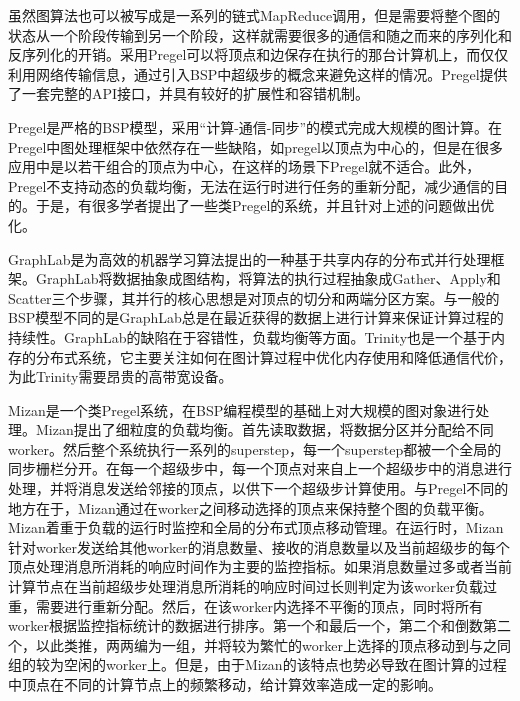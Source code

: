 虽然图算法也可以被写成是一系列的链式MapReduce调用，但是需要将整个图的状态从一个阶段传输到另一个阶段，这样就需要很多的通信和随之而来的序列化和反序列化的开销。采用Pregel可以将顶点和边保存在执行的那台计算机上，而仅仅利用网络传输信息，通过引入BSP中超级步的概念来避免这样的情况。Pregel提供了一套完整的API接口，并具有较好的扩展性和容错机制。

Pregel是严格的BSP模型，采用“计算-通信-同步”的模式完成大规模的图计算。在Pregel中图处理框架中依然存在一些缺陷，如pregel以顶点为中心的，但是在很多应用中是以若干组合的顶点为中心，在这样的场景下Pregel就不适合。此外，Pregel不支持动态的负载均衡，无法在运行时进行任务的重新分配，减少通信的目的。于是，有很多学者提出了一些类Pregel的系统，并且针对上述的问题做出优化。

GraphLab\cite{low2010graphlab}是为高效的机器学习算法提出的一种基于共享内存的分布式并行处理框架。GraphLab将数据抽象成图结构，将算法的执行过程抽象成Gather、Apply和Scatter三个步骤，其并行的核心思想是对顶点的切分和两端分区方案。与一般的BSP模型不同的是GraphLab总是在最近获得的数据上进行计算来保证计算过程的持续性。GraphLab的缺陷在于容错性，负载均衡等方面。Trinity\cite{shao2013trinity}也是一个基于内存的分布式系统，它主要关注如何在图计算过程中优化内存使用和降低通信代价，为此Trinity需要昂贵的高带宽设备。

Mizan\cite{khayyat2013mizan}是一个类Pregel系统，在BSP编程模型的基础上对大规模的图对象进行处理。Mizan提出了细粒度的负载均衡。首先读取数据，将数据分区并分配给不同worker。然后整个系统执行一系列的superstep，每一个superstep都被一个全局的同步栅栏分开。在每一个超级步中，每一个顶点对来自上一个超级步中的消息进行处理，并将消息发送给邻接的顶点，以供下一个超级步计算使用。与Pregel不同的地方在于，Mizan通过在worker之间移动选择的顶点来保持整个图的负载平衡。Mizan着重于负载的运行时监控和全局的分布式顶点移动管理。在运行时，Mizan针对worker发送给其他worker的消息数量、接收的消息数量以及当前超级步的每个顶点处理消息所消耗的响应时间作为主要的监控指标。如果消息数量过多或者当前计算节点在当前超级步处理消息所消耗的响应时间过长则判定为该worker负载过重，需要进行重新分配。然后，在该worker内选择不平衡的顶点，同时将所有worker根据监控指标统计的数据进行排序。第一个和最后一个，第二个和倒数第二个，以此类推，两两编为一组，并将较为繁忙的worker上选择的顶点移动到与之同组的较为空闲的worker上。但是，由于Mizan的该特点也势必导致在图计算的过程中顶点在不同的计算节点上的频繁移动，给计算效率造成一定的影响。

